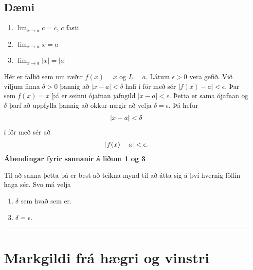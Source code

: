 \documentclass[a4paper,10pt,icelandic]{sphinxmanual}
\begin{document}
\subsection{Dæmi}
\label{kafli02:daemi2-1}\label{kafli02:daemi}\begin{enumerate}
\item {} 
\(\lim_{x \to a} c = c\), \(c\) fasti

\item {} 
\(\lim_{x \to a} x = a\)

\item {} 
\(\lim_{x \to a} |x| = |a|\)

\end{enumerate}

Hér er fallið sem um ræðir \(f(x) = x\) og \(L=a\).
Látum \(\epsilon>0\) vera gefið. Við viljum finna
\(\delta >0\) þannig að \(|x-a|<\delta\) hafi í för
með sér \(|f(x)-a| < \epsilon\). Þar sem \(f(x)=x\) þá er seinni
ójafnan jafngild \(|x-a|<\epsilon\). Þetta er sama ójafnan og
\(\delta\) þarf að uppfylla þannig að okkur nægir að velja
\(\delta = \epsilon\). Þá hefur
\begin{gather}
\begin{split}|x-a| < \delta\end{split}\notag
\end{gather}
í för með sér að
\begin{gather}
\begin{split}|f(x) -a| < \epsilon.\end{split}\notag
\end{gather}
\textbf{Ábendingar fyrir sannanir á liðum 1 og 3}

Til að sanna þetta þá er best að teikna mynd til að átta sig á því hvernig
föllin haga sér. Svo má velja
\begin{enumerate}
\item {} 
\(\delta\) sem hvað sem er.

\end{enumerate}
\begin{enumerate}
\setcounter{enumi}{2}
\item {} 
\(\delta=\epsilon\).

\end{enumerate}


\bigskip\hrule{}\bigskip



\section{Markgildi frá hægri og vinstri}
\label{kafli02:markgildi-fra-haegri-og-vinstri}
\end{document}
